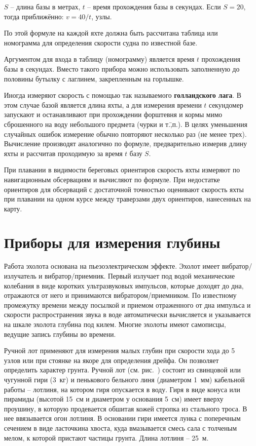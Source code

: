 $S$ \--- длина базы в метрах, $t$ \--- время прохождения базы в
секундах. Если $S = 20$\tmin, тогда приближённо: $v = 40 / t$, узлы.

По этой формуле на каждой яхте должна быть рассчитана таблица или
номограмма для определения скорости судна по известной базе.

Аргументом для входа в таблицу (номограмму) является время $t$
прохождения базы в секундах. Вместо такого прибора можно использовать
заполненную до половины бутылку с лаглинем, закрепленным на горлышке.

Иногда измеряют скорость с помощью так называемого
\textbf{голландского лага}.  В этом случае
базой является длина яхты, а для измерения времени $t$ секундомер
запускают и останавливают при прохождении форштевня и кормы мимо
сброшенного на воду небольшого предмета (чурки и т.\=,п.). В целях
уменьшения случайных ошибок измерение обычно повторяют несколько раз
(не менее трех). Вычисление производят аналогично по формуле,
предварительно измерив длину яхты и рассчитав проходимую за время $t$
базу $S$.

При плавании в видимости береговых ориентиров скорость яхты измеряют
по навигационным обсервациям и вычисляют по формуле. При недостатке
ориентиров для обсерваций с достаточной точностью оценивают скорость
яхты при плавании на одном курсе между траверзами двух ориентиров,
нанесенных на карту.

\section{Приборы для измерения глубины}

Работа эхолота основана на пьезоэлектрическом
эффекте. Эхолот имеет вибратор\-/излучатель и
вибратор\-/приемник. Первый излучает под водой механические колебания
в виде коротких ультразвуковых импульсов, которые доходят до дна,
отражаются от него и принимаются вибратором\-/приемником. По
известному промежутку времени между посылкой и приемом отраженного от
дна импульса и скорости распространения звука в воде автоматически
вычисляется и указывается на шкале эхолота глубина под килем. Многие
эхолоты имеют самописцы, ведущие запись глубины во времени.

Ручной лот применяют для измерения малых глубин при
скорости хода до 5 узлов или при стоянке на якоре для определения
дрейфа. Он позволяет определить характер грунта. Ручной лот
(см. рис.~) состоит из свинцовой или чугунной гири (3~кг) и пенькового бельного линя (диаметром 1~мм) кабельной работы
\--- лотлиня, на котором гиря опускается в воду. Гиря в виде конуса
или пирамиды (высотой 15~см и диаметром у основания 5~см) имеет вверху проушину, в которую продевается обшитая кожей
стропка из стального троса. В нее ввязывается огон лотлиня. В
основании гири имеется лунка с поперечным сечением в виде ласточкина
хвоста, куда вмазывается смесь сала с толченым мелом, к которой
пристают частицы грунта. Длина лотлиня \--- 25~м.

